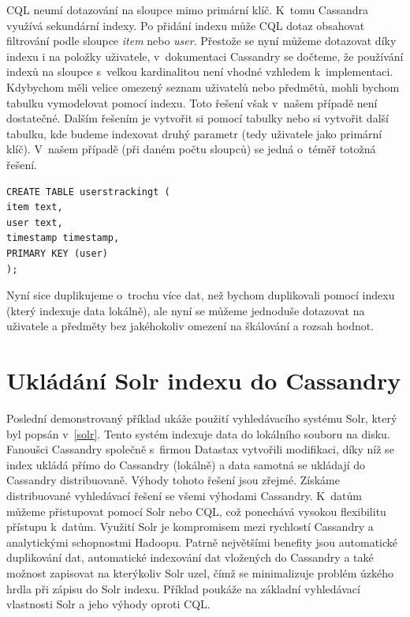 CQL neumí dotazování na sloupce mimo primární klíč. K~tomu Cassandra využívá sekundární indexy. Po přidání indexu může CQL dotaz obsahovat filtrování podle sloupce \emph{item} nebo \emph{user}. Přestože se nyní můžeme dotazovat díky indexu i na položky uživatele, v~dokumentaci Cassandry \cite{cassaindex} se dočteme, že používání indexů na sloupce s~velkou kardinalitou není vhodné vzhledem k~implementaci. Kdybychom měli velice omezený seznam uživatelů nebo předmětů, mohli bychom tabulku vymodelovat pomocí indexu. Toto řešení však v~našem případě není dostatečné. Dalším řešením je vytvořit si  pomocí tabulky nebo si vytvořit další tabulku, kde budeme indexovat druhý parametr (tedy uživatele jako primární klíč). V~našem případě (při daném počtu sloupců) se jedná o~téměř totožná řešení. 

\begin{lstlisting}[caption={Vytvoření indexovací tabulky},label=CQL11]
CREATE TABLE userstrackingt ( 
item text,
user text,
timestamp timestamp,
PRIMARY KEY (user)
);
\end{lstlisting}

Nyní sice duplikujeme o~trochu více dat, než bychom duplikovali pomocí indexu (který indexuje data lokálně), ale nyní se můžeme jednoduše dotazovat na uživatele a předměty bez jakéhokoliv omezení na škálování a rozsah hodnot. 

\section{Ukládání Solr indexu do Cassandry}
Poslední demonstrovaný příklad ukáže použití vyhledávacího systému Solr, který byl popsán v~\ref{solr}. Tento systém indexuje data do lokálního souboru na disku. Fanoušci Cassandry společně s~firmou Datastax vytvořili modifikaci, díky níž se index ukládá přímo do Cassandry (lokálně) a data samotná se ukládají do Cassandry distribuovaně. Výhody tohoto řešení jsou zřejmé. Získáme distribuované vyhledávací řešení se všemi výhodami Cassandry. K~datům můžeme přistupovat pomocí Solr nebo CQL, což ponechává vysokou flexibilitu přístupu k~datům. Využití Solr je kompromisem mezi rychlostí Cassandry a analytickými schopnostmi Hadoopu. Patrně největšími benefity jsou automatické duplikování dat, automatické indexování dat vložených do Cassandry a také možnost zapisovat na kterýkoliv Solr uzel, čímž se minimalizuje problém úzkého hrdla při zápisu do Solr indexu. Příklad poukáže na základní vyhledávací vlastnosti Solr a jeho výhody oproti CQL.